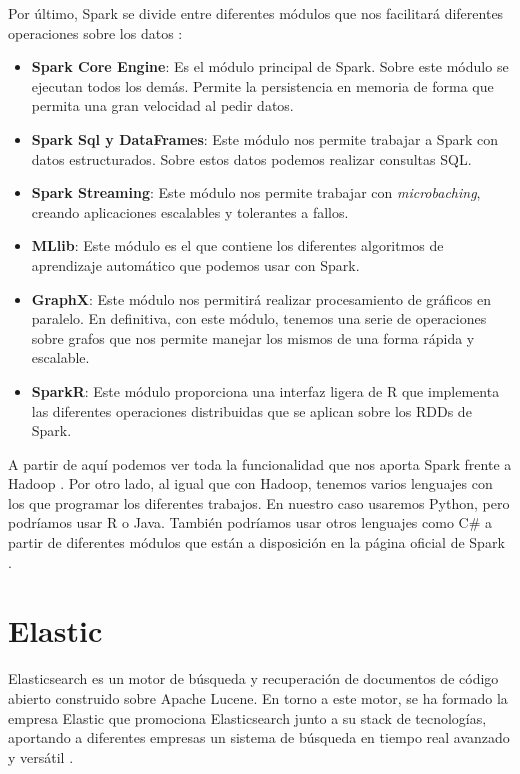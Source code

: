 Por último, Spark se divide entre diferentes módulos que nos facilitará
diferentes operaciones sobre los datos \cite{Spk-3}:

\begin{itemize}
\item \textbf{Spark Core Engine}: Es el módulo principal de Spark. Sobre
  este módulo se ejecutan todos los demás. Permite la persistencia en
  memoria de forma que permita una gran velocidad al pedir datos.
\item \textbf{Spark Sql y DataFrames}: Este módulo nos permite trabajar a
  Spark con datos estructurados. Sobre estos datos podemos realizar
  consultas SQL.
\item \textbf{Spark Streaming}: Este módulo nos permite trabajar con {\em
    microbaching}, creando aplicaciones escalables y tolerantes a fallos.
\item \textbf{MLlib}: Este módulo es el que contiene los diferentes
  algoritmos de aprendizaje automático que podemos usar con Spark.
\item \textbf{GraphX}: Este módulo nos permitirá realizar procesamiento de
  gráficos en paralelo. En definitiva, con este módulo, tenemos una serie
  de operaciones sobre grafos que nos permite manejar los mismos de una
  forma rápida y escalable.
\item \textbf{SparkR}: Este módulo proporciona una interfaz ligera de R que
  implementa las diferentes operaciones distribuidas que se aplican sobre
  los RDDs de Spark.
\end{itemize}

A partir de aquí podemos ver toda la funcionalidad que nos aporta Spark
frente a Hadoop \cite{Spk-7}. Por otro lado, al igual que con Hadoop,
tenemos varios lenguajes con los que programar los diferentes trabajos. En
nuestro caso usaremos Python, pero podríamos usar R o Java. También
podríamos usar otros lenguajes como C\# a partir de diferentes módulos que
están a disposición en la página oficial de Spark \cite{Spk-6}.


\section{Elastic\label{Elastic}}

Elasticsearch es un motor de búsqueda y recuperación de documentos de
código abierto construido sobre Apache Lucene. En torno a este motor, se ha
formado la empresa Elastic que promociona Elasticsearch junto a su stack de
tecnologías, aportando a diferentes empresas un sistema de búsqueda en
tiempo real avanzado y versátil \cite{Elk-1}.

